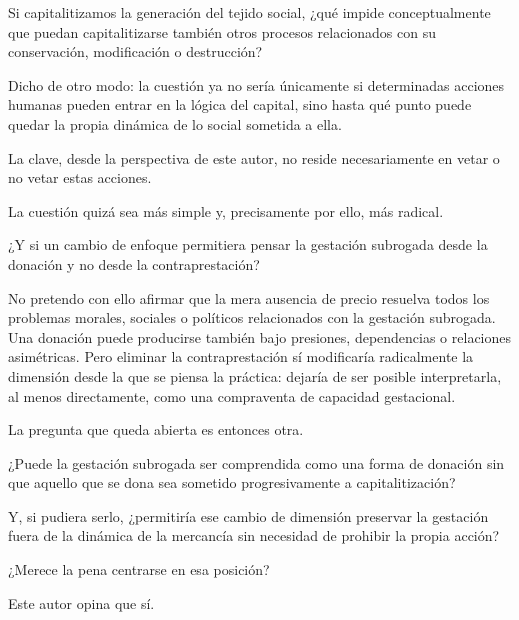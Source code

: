 \documentclass[12pt]{article}
\begin{document}
Si capitalitizamos la generación del tejido social, ¿qué impide conceptualmente que puedan capitalitizarse también otros procesos relacionados con su conservación, modificación o destrucción?

Dicho de otro modo: la cuestión ya no sería únicamente si determinadas acciones humanas pueden entrar en la lógica del capital, sino hasta qué punto puede quedar la propia dinámica de lo social sometida a ella.

La clave, desde la perspectiva de este autor, no reside necesariamente en vetar o no vetar estas acciones.

La cuestión quizá sea más simple y, precisamente por ello, más radical.

¿Y si un cambio de enfoque permitiera pensar la gestación subrogada desde la donación y no desde la contraprestación?

No pretendo con ello afirmar que la mera ausencia de precio resuelva todos los problemas morales, sociales o políticos relacionados con la gestación subrogada. Una donación puede producirse también bajo presiones, dependencias o relaciones asimétricas. Pero eliminar la contraprestación sí modificaría radicalmente la dimensión desde la que se piensa la práctica: dejaría de ser posible interpretarla, al menos directamente, como una compraventa de capacidad gestacional.

La pregunta que queda abierta es entonces otra.

¿Puede la gestación subrogada ser comprendida como una forma de donación sin que aquello que se dona sea sometido progresivamente a capitalitización?

Y, si pudiera serlo, ¿permitiría ese cambio de dimensión preservar la gestación fuera de la dinámica de la mercancía sin necesidad de prohibir la propia acción?

¿Merece la pena centrarse en esa posición?

Este autor opina que sí.
\end{document}
